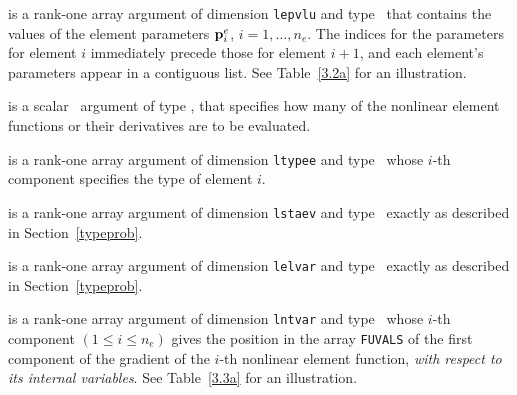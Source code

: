 \documentclass{galahad}
\begin{document}
\begin{description}
 is a rank-one \intentin array argument of
dimension {\tt lepvlu}  and type \realdp\,
that contains the values of the element parameters ${\mathbf{p}}^e_i$, $i = 1, \ldots,
n_e$. The indices for the parameters for element $i$ immediately precede
those for element $i+1$, and each element's parameters appear in a contiguous
list. See Table~\ref{3.2a} for an illustration.

 is a scalar \intentin\ argument of type \integer,
that specifies how many of the nonlinear element functions or their
derivatives are to be evaluated.

 is a rank-one \intentin array argument of
dimension {\tt ltypee} and type \integer\,
whose $i$-th component specifies the type of element $i$.

 is a rank-one \intentin array argument of
dimension {\tt lstaev} and type \integer\,
exactly as described in Section~\ref{typeprob}.

 is a rank-one \intentin array argument of
dimension {\tt lelvar} and type \integer\,
exactly as described in Section~\ref{typeprob}.

 is a rank-one \intentin array argument of
dimension {\tt lntvar} and type \integer\,
whose $i$-th component $(1 \leq i \leq n_e )$
gives the position in the array {\tt FUVALS} of the first component of
the gradient of the $i$-th nonlinear element function, {\em with respect
to its internal variables}.
See Table~\ref{3.3a} for an illustration.


\end{description}
\end{document}
